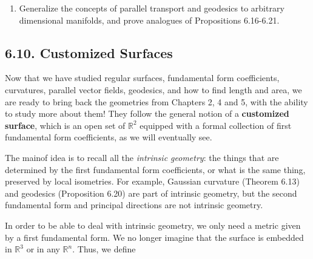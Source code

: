 \documentclass[leqno]{book}
\begin{document}
\begin{enumerate}
(c) Let $S$ be a compact orientable surface, and tile the surface into $F$ faces, $E$ edges and $V$ vertices.  Show that $F-E+V=\frac 1{2\pi}\int_SK\,d\sigma$, and hence does not depend on the particular tiling.  This integer is called the \textbf{Euler characteristic} of $S$ and is denoted $\chi(S)$.

(d) The Euler characteristic of $S^2$ is $2$, and the Euler characteristic of the torus is $0$.

Any compact orientable surface other than the sphere is, in fact, obtained by taking a certain number of tori and pasting them in chain by cutting circular holes out of them and gluing them together around the holes.  If there are $n$ tori involved, the surface is said to have \textbf{genus $n$}, and its Euler characteristic is $2-2n$.

\item Generalize the concepts of parallel transport and geodesics to arbitrary dimensional manifolds, and prove analogues of Propositions 6.16-6.21.
\end{enumerate}

\subsection*{6.10. Customized Surfaces}
Now that we have studied regular surfaces, fundamental form coefficients, curvatures, parallel vector fields, geodesics, and how to find length and area, we are ready to bring back the geometries from Chapters 2, 4 and 5, with the ability to study more about them!  They follow the general notion of a \textbf{customized surface}, which is an open set of $\mathbb R^2$ equipped with a formal collection of first fundamental form coefficients, as we will eventually see.

The mainof idea is to recall all the \emph{intrinsic geometry}: the things that are determined by the first fundamental form coefficients, or what is the same thing, preserved by local isometries.  For example, Gaussian curvature (Theorem 6.13) and geodesics (Proposition 6.20) are part of intrinsic geometry, but the second fundamental form and principal directions are not intrinsic geometry.

In order to be able to deal with intrinsic geometry, we only need a metric given by a first fundamental form.  We no longer imagine that the surface is embedded in $\mathbb R^3$ or in any $\mathbb R^n$.  Thus, we define\\
\end{document}
